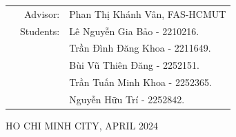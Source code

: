 \documentclass[a4paper]{article}
\begin{document}
\begin{titlepage}
\begin{table}[h]
	\begin{tabular}{rrl}
		\hspace{5 cm} & Advisor: & Phan Thị Khánh Vân, FAS-HCMUT\\[6pt]
		& Students: & Lê Nguyễn Gia Bảo \hspace*{0.05cm} - 2210216. \\
		& 			& Trần Đình Đăng Khoa \hspace*{0.15cm} - 2211649. \\
		& 			& Bùi Vũ Thiên Đăng	  \hspace*{0.41cm} - 2252151. \\
		& 			& Trần Tuấn Minh Khoa 	  \hspace*{0.5cm} - 2252365. \\
		& 			& Nguyễn Hữu Trí		  \hspace*{1.2cm} - 2252842. \\
	\end{tabular}
\end{table}

\vspace*{1cm}

\begin{center}
{\footnotesize HO CHI MINH CITY, APRIL 2024}
\end{center}
\end{titlepage}


\newpage
\tableofcontents

% 
% 
% 
% 
% 
% 
% 
\clearpage
% 
% 
\end{document}
